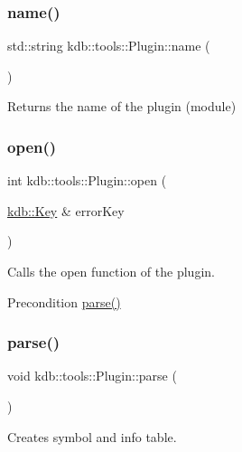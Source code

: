 \subsubsection{\texorpdfstring{name()}{name()}}
{\footnotesize\ttfamily std\+::string kdb\+::tools\+::\+Plugin\+::name (\begin{DoxyParamCaption}{ }\end{DoxyParamCaption})}

\begin{DoxyReturn}{Returns}
the name of the plugin (module) 
\end{DoxyReturn}
\mbox{\label{classkdb_1_1tools_1_1Plugin_a680a490123b5290441d76ef2c1e3f1fa}} 
\subsubsection{\texorpdfstring{open()}{open()}}
{\footnotesize\ttfamily int kdb\+::tools\+::\+Plugin\+::open (\begin{DoxyParamCaption}\item[{\mbox{\hyperlink{classkdb_1_1Key}{kdb\+::\+Key}} \&}]{error\+Key }\end{DoxyParamCaption})}



Calls the open function of the plugin. 

\begin{DoxyPrecond}{Precondition}
\mbox{\hyperlink{classkdb_1_1tools_1_1Plugin_adfcba2fbdeb436a1083410df804d5fb0}{parse()}} 
\end{DoxyPrecond}
\mbox{\label{classkdb_1_1tools_1_1Plugin_adfcba2fbdeb436a1083410df804d5fb0}} 
\subsubsection{\texorpdfstring{parse()}{parse()}}
{\footnotesize\ttfamily void kdb\+::tools\+::\+Plugin\+::parse (\begin{DoxyParamCaption}{ }\end{DoxyParamCaption})}



Creates symbol and info table. 

